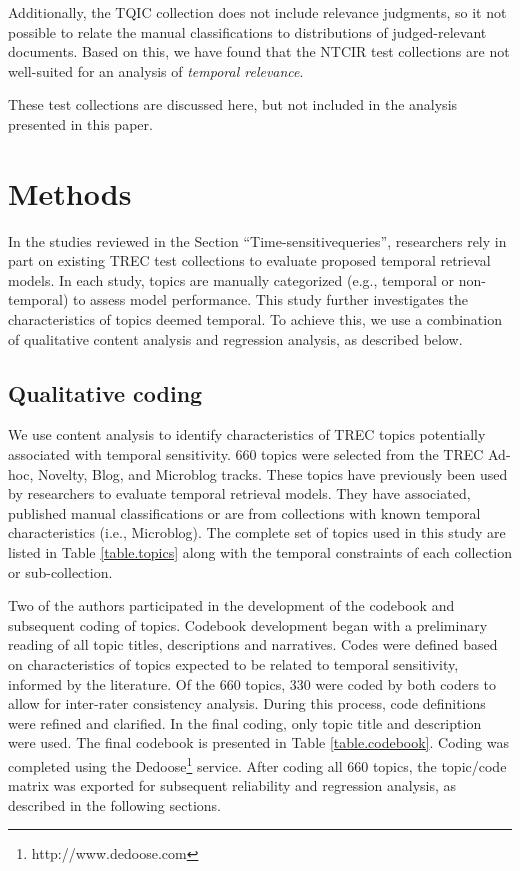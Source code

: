 \documentclass{asist}
\begin{document}
Additionally, the TQIC collection does not include relevance judgments, so it not possible to relate the manual classifications to distributions of judged-relevant documents. Based on this, we have found that the NTCIR test collections are not well-suited for an analysis of \emph{temporal relevance}.

These test collections are discussed here, but not included in the analysis presented in this paper.


\section{Methods}

In the studies reviewed in the Section ``Time-sensitivequeries'', researchers rely in part on existing TREC test collections to evaluate proposed temporal retrieval models. In each study, topics are manually categorized (e.g.,  temporal or non-temporal) to assess model performance. This study further investigates the characteristics of topics deemed temporal. To achieve this, we use a combination of qualitative content analysis and regression analysis, as described below.

\subsection{Qualitative coding}
We use content analysis \cite{Krippendorff1980} to identify characteristics of TREC topics potentially associated with temporal sensitivity. 660 topics were selected from the TREC Ad-hoc, Novelty, Blog, and Microblog tracks. These topics have previously been used by researchers to evaluate temporal retrieval models. They have associated, published manual classifications or are from collections with known temporal characteristics (i.e., Microblog). The complete set of topics used in this study are listed in Table \ref{table.topics} along with the temporal constraints of each collection or sub-collection.



Two of the authors participated in the development of the codebook and subsequent coding of topics. Codebook development began with a preliminary reading of all topic titles, descriptions and narratives. Codes were defined based on characteristics of topics expected to be related to temporal sensitivity, informed by the literature. Of the 660 topics, 330 were coded by both coders to allow for inter-rater consistency analysis. During this process, code definitions were refined and clarified. In the final coding, only topic title and description were used. The final codebook is presented in Table \ref{table.codebook}. Coding was completed using the Dedoose\footnote{http://www.dedoose.com} service.  After coding all 660 topics, the topic/code matrix was exported for subsequent reliability and regression analysis, as described in the following sections. 
\end{document}
